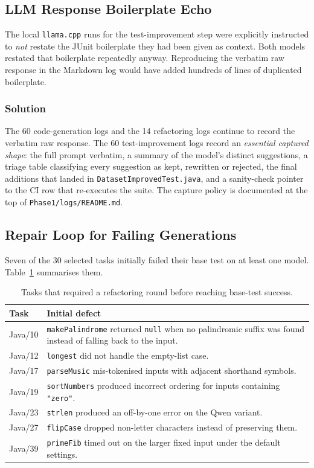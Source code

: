\documentclass[journal]{IEEEtran}
\begin{document}
\subsection{LLM Response Boilerplate Echo}

The local \texttt{llama.cpp} runs for the test-improvement step were
explicitly instructed to \emph{not} restate the JUnit boilerplate they had
been given as context. Both models restated that boilerplate repeatedly
anyway. Reproducing the verbatim raw response in the Markdown log would
have added hundreds of lines of duplicated boilerplate.

\subsubsection{Solution}
The 60 code-generation logs and the 14 refactoring logs continue to record
the verbatim raw response. The 60 test-improvement logs record an
\emph{essential captured shape}: the full prompt verbatim, a summary of
the model's distinct suggestions, a triage table classifying every
suggestion as kept, rewritten or rejected, the final additions that landed
in \texttt{DatasetImprovedTest.java}, and a sanity-check pointer to the CI
row that re-executes the suite. The capture policy is documented at the
top of \texttt{Phase1/logs/README.md}.

\subsection{Repair Loop for Failing Generations}

Seven of the 30 selected tasks initially failed their base test on at
least one model. Table~\ref{tab:repair} summarises them.

\begin{table}[!t]
\renewcommand{\arraystretch}{1.15}
\caption{Tasks that required a refactoring round before reaching base-test success.}
\label{tab:repair}
\centering
\footnotesize
\begin{tabular}{@{}lp{14.0cm}@{}}
\toprule
\textbf{Task} & \textbf{Initial defect} \\
\midrule
Java/10 & \texttt{makePalindrome} returned \texttt{null} when no
        palindromic suffix was found instead of falling back to the input. \\
Java/12 & \texttt{longest} did not handle the empty-list case. \\
Java/17 & \texttt{parseMusic} mis-tokenised inputs with adjacent shorthand
        symbols. \\
Java/19 & \texttt{sortNumbers} produced incorrect ordering for inputs
        containing \texttt{"zero"}. \\
Java/23 & \texttt{strlen} produced an off-by-one error on the Qwen variant. \\
Java/27 & \texttt{flipCase} dropped non-letter characters instead of
        preserving them. \\
Java/39 & \texttt{primeFib} timed out on the larger fixed input under the
        default settings. \\
\bottomrule
\end{tabular}
\end{table}
\end{document}
